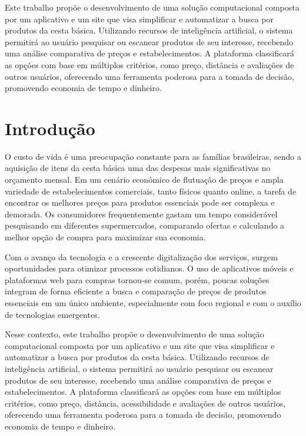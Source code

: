 \documentclass[
  article,
  a4paper,
  12pt,
  oneside,
  fleqn
]{abntex2}
\begin{document}
\pretextual

\begin{paginadetitulo}
    \begin{ambienteresumo}
        Este trabalho propõe o desenvolvimento de uma solução computacional composta por um aplicativo e um site que visa simplificar e automatizar a busca por produtos da cesta básica. Utilizando recursos de inteligência artificial, o sistema permitirá ao usuário pesquisar ou escanear produtos de seu interesse, recebendo uma análise comparativa de preços e estabelecimentos. A plataforma classificará as opções com base em múltiplos critérios, como preço, distância e avaliações de outros usuários, oferecendo uma ferramenta poderosa para a tomada de decisão, promovendo economia de tempo e dinheiro.
    \end{ambienteresumo}
\end{paginadetitulo}

\textual
\newpage

\section{Introdução}

O custo de vida é uma preocupação constante para as famílias brasileiras, sendo a aquisição de itens da cesta básica uma das despesas mais significativas no orçamento mensal. Em um cenário econômico de flutuação de preços e ampla variedade de estabelecimentos comerciais, tanto físicos quanto online, a tarefa de encontrar os melhores preços para produtos essenciais pode ser complexa e demorada. Os consumidores frequentemente gastam um tempo considerável pesquisando em diferentes supermercados, comparando ofertas e calculando a melhor opção de compra para maximizar sua economia.

Com o avanço da tecnologia e a crescente digitalização dos serviços, surgem oportunidades para otimizar processos cotidianos. O uso de aplicativos móveis e plataformas web para compras tornou-se comum, porém, poucas soluções integram de forma eficiente a busca e comparação de preços de produtos essenciais em um único ambiente, especialmente com foco regional e com o auxílio de tecnologias emergentes.

Nesse contexto, este trabalho propõe o desenvolvimento de uma solução computacional composta por um aplicativo e um site que visa simplificar e automatizar a busca por produtos da cesta básica. Utilizando recursos de inteligência artificial, o sistema permitirá ao usuário pesquisar ou escanear produtos de seu interesse, recebendo uma análise comparativa de preços e estabelecimentos. A plataforma classificará as opções com base em múltiplos critérios, como preço, distância, acessibilidade e avaliações de outros usuários, oferecendo uma ferramenta poderosa para a tomada de decisão, promovendo economia de tempo e dinheiro.
\end{document}
